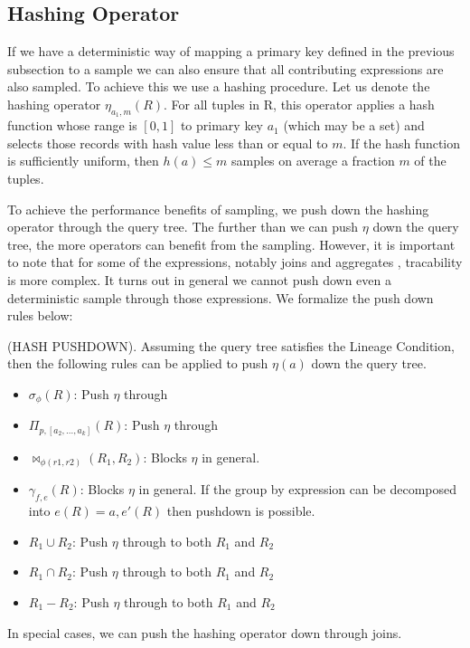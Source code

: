 \subsection{Hashing Operator}
If we have a deterministic way of mapping a primary key defined in the previous subsection to a sample we can also ensure that all contributing expressions are also sampled. 
To achieve this we use a hashing procedure.
Let us denote the hashing operator $\eta_{a_1, m}(R)$. 
For all tuples in R, this operator applies a hash function whose range is $[0,1]$ to primary key $a_1$ (which may be a set) and selects those records with hash value less than or equal to $m$.
If the hash function is sufficiently uniform, then $h(a) \le m$ samples on average a fraction $m$ of the tuples.

To achieve the performance benefits of sampling, we push down the hashing operator through the query tree.
The further than we can push $\eta$ down the query tree, the more operators can benefit from the sampling.
However, it is important to note that for some of the expressions, notably joins and aggregates , tracability  is more complex.
It turns out in general we cannot push down even a deterministic sample through those expressions.
We formalize the push down rules below:
\begin{proposition}
(HASH PUSHDOWN). Assuming the query tree satisfies the Lineage Condition, then the following rules can be applied to push $\eta(a)$ down the query tree. 
\begin{itemize}\vspace{-.45em}
\item $\sigma_{\phi}(R)$: Push $\eta$ through \vspace{-.45em}
\item $\Pi_{p,[a_2,...,a_k]}(R)$: Push $\eta $ through \vspace{-.45em}
\item $\bowtie_{\phi (r1,r2)}(R_1,R_2)$: Blocks $\eta $ in general. 
\item $\gamma_{f,e}(R)$: Blocks $\eta$ in general. If the group by expression can be decomposed into $e(R) = a, e'(R)$ then pushdown is possible. \vspace{-.45em}
\item $R_1 \cup R_2$: Push $\eta $ through to both $R_1$ and $R_2$
\item $R_1 \cap R_2$: Push $\eta $ through to both $R_1$ and $R_2$
\item $R_1 - R_2$: Push $\eta $ through to both $R_1$ and $R_2$
\end{itemize}
\end{proposition}
In special cases, we can push the hashing operator down through joins. 

